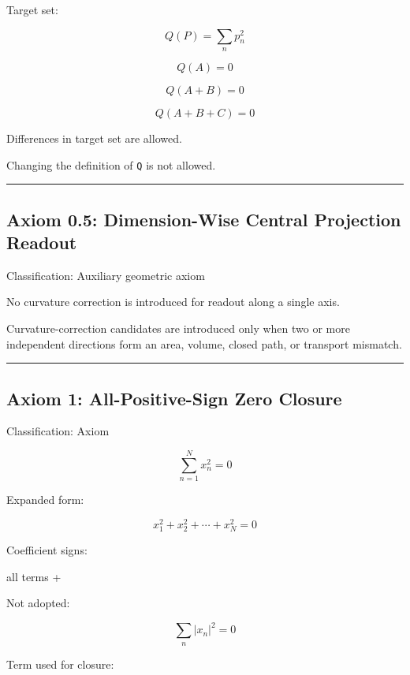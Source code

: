 \documentclass[
  a4paper,
]{article}
\newenvironment{Shaded}{}{}
\newcommand{\NormalTok}[1]{#1}
\begin{document}
Target set:

\[
Q(P)=\sum_n p_n^2
\]

\[
Q(A)=0
\]

\[
Q(A+B)=0
\]

\[
Q(A+B+C)=0
\]

Differences in target set are allowed.

Changing the definition of \texttt{Q} is not allowed.

\begin{center}\rule{0.5\linewidth}{0.5pt}\end{center}

\subsection{Axiom 0.5: Dimension-Wise Central Projection
Readout}\label{axiom-0.5-dimension-wise-central-projection-readout}

Classification: Auxiliary geometric axiom

No curvature correction is introduced for readout along a single axis.

Curvature-correction candidates are introduced only when two or more
independent directions form an area, volume, closed path, or transport
mismatch.

\begin{center}\rule{0.5\linewidth}{0.5pt}\end{center}

\subsection{Axiom 1: All-Positive-Sign Zero
Closure}\label{axiom-1-all-positive-sign-zero-closure}

Classification: Axiom

\[
\sum_{n=1}^{N}x_n^2=0
\]

Expanded form:

\[
x_1^2+x_2^2+\cdots+x_N^2=0
\]

Coefficient signs:

\begin{Shaded}
\begin{Highlighting}[]
\NormalTok{all terms +}
\end{Highlighting}
\end{Shaded}

Not adopted:

\[
\sum_n |x_n|^2=0
\]

Term used for closure:
\end{document}
